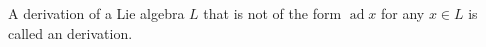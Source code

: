 A derivation of a Lie algebra $L$ that is not of the form $\operatorname{ad} x$ for any $x \in L$ is called an  derivation.
